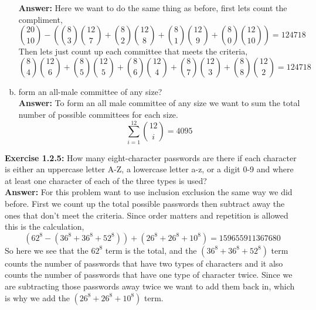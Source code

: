 \documentclass{amsart}
\begin{document}
\begin{enumerate}[(a)]
\noindent \textbf{Answer:}
Here we want to do the same thing as before, first lets count the compliment,
\begin{equation}
{{20} \choose {10}}-({{8} \choose {3}}{{12} \choose {7}}+{{8} \choose {2}}{{12} \choose {8}}+{{8} \choose {1}}{{12} \choose {9}}+{{8} \choose {0}}{{12} \choose {10}})=124718
\end{equation}
Then lets just count up each committee that meets the criteria,
\begin{equation}
{{8} \choose {4}}{{12} \choose {6}}+{{8} \choose {5}}{{12} \choose {5}}+{{8} \choose {6}}{{12} \choose {4}}+{{8} \choose {7}}{{12} \choose {3}}+{{8} \choose {8}}{{12} \choose {2}}=124718
\end{equation}


\vspace{1in}

\item form an all-male committee of any size?\\


\noindent \textbf{Answer:}
To form an all male committee of any size we want to sum the total number of possible committees for each size.
\begin{equation}
\sum_{i=1}^{12}{12 \choose i}=4095
\end{equation}
\vspace{1in}
\end{enumerate}

\noindent\textbf{Exercise 1.2.5: } How many eight-character passwords are there if each character is either an uppercase letter A-Z, a lowercase letter a-z, or a digit 0-9 and where at least one character of each of the three types is used? \\

\noindent \textbf{Answer:}
For this problem want to use inclusion exclusion the same way we did before. First we count up the total possible passwords then subtract away the ones that don't meet the criteria. Since order matters and repetition is allowed this is the calculation,
\begin{equation}
(62^{8}-(36^{8}+36^{8}+52^{8}))+(26^{8}+26^{8}+10^{8})=159655911367680
\end{equation}
So here we see that the $62^{8}$ term is the total, and the $(36^{8}+36^{8}+52^{8})$ term counts the number of passwords that have two types of characters and it also counts the number of passwords that have one type of character twice. Since we are subtracting those passwords away twice we want to add them back in, which is why we add the $(26^{8}+26^{8}+10^{8})$ term.
\vspace{1in}
\end{document}
